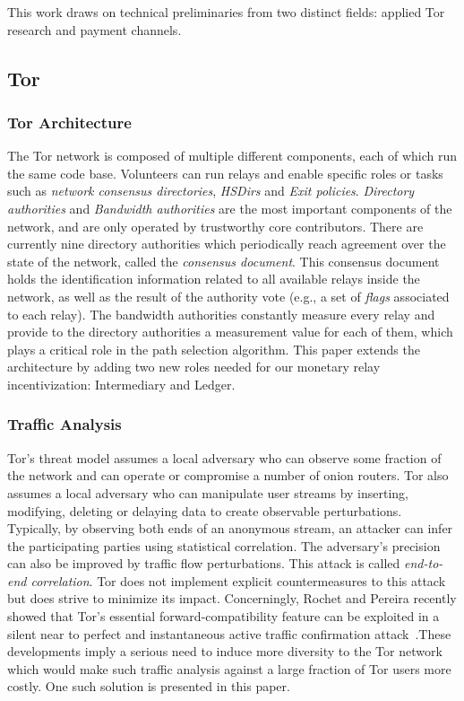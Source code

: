 This work draws on technical preliminaries from two distinct fields: applied
Tor research and payment channels.

\subsection{Tor}

\subsubsection{Tor Architecture}
The Tor network is composed of multiple different components, each of which run
the same code base. Volunteers can run relays and enable specific roles or tasks
such as \textit{network consensus directories}, \textit{HSDirs} and \textit{Exit
  policies}. \textit{Directory authorities} and \textit{Bandwidth authorities}
are the most important components of the network, and are only operated by
trustworthy core contributors. There are currently nine directory authorities
which periodically reach agreement over the state of the network, called the
\textit{consensus document}. This consensus document holds the identification
information related to all available relays inside the network, as well as the
result of the authority vote (e.g., a set of \textit{flags} associated to each
relay). The bandwidth authorities constantly measure every relay and provide to
the directory authorities a measurement value for each of them, which plays a
critical role in the path selection algorithm. This paper extends the
architecture by adding two new roles needed for our monetary relay
incentivization: Intermediary and Ledger.

\subsubsection{Traffic Analysis}
Tor's threat model assumes a local adversary who can observe some fraction of
the network and can operate or compromise a number of onion routers. Tor also
assumes a local adversary who can manipulate user streams by inserting,
modifying, deleting or delaying data to create observable
perturbations. Typically, by observing both ends of an anonymous stream, an
attacker can infer the participating parties using statistical correlation. The
adversary's precision can also be improved by traffic flow perturbations. This
attack is called \textit{end-to-end correlation}. Tor does not implement
explicit countermeasures to this attack but does strive to minimize its
impact. Concerningly, Rochet and Pereira recently showed that Tor's essential
forward-compatibility feature can be exploited in a silent near to perfect and
instantaneous active traffic confirmation attack~\cite{rochet2018dropping}.These
developments imply a serious need to induce more diversity to the Tor network
which would make such traffic analysis against a large fraction of Tor users
more costly. One such solution is presented in this paper.

